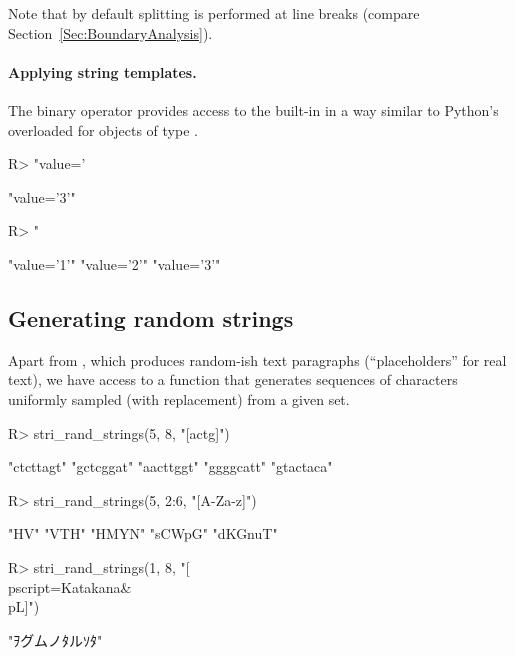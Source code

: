 \documentclass[nojss]{jss}
\begin{document}
Note that by default splitting is performed at line breaks
(compare Section~\ref{Sec:BoundaryAnalysis}).






\paragraph{Applying string templates.}
The binary operator  provides access to the built-in
 in a way similar to Python's \code{\%} overloaded
for objects of type .

\begin{Schunk}
\begin{Sinput}
R> "value='%d'" %s$% 3               # equivalently: "value='%d'" %s$% list(3)
\end{Sinput}
\begin{Soutput}
[1] "value='3'"
\end{Soutput}
\begin{Sinput}
R> "%s='%d'"    %s$% list("value", 1:3)
\end{Sinput}
\begin{Soutput}
[1] "value='1'" "value='2'" "value='3'"
\end{Soutput}
\end{Schunk}





\subsection{Generating random strings}

Apart from ,
which produces random-ish text paragraphs (``placeholders'' for real text),
we have access to a function that generates sequences of characters
uniformly sampled (with replacement) from a given set.

\begin{Schunk}
\begin{Sinput}
R> stri_rand_strings(5, 8, "[actg]")
\end{Sinput}
\begin{Soutput}
[1] "ctcttagt" "gctcggat" "aacttggt" "ggggcatt" "gtactaca"
\end{Soutput}
\begin{Sinput}
R> stri_rand_strings(5, 2:6, "[A-Za-z]")
\end{Sinput}
\begin{Soutput}
[1] "HV"     "VTH"    "HMYN"   "sCWpG"  "dKGnuT"
\end{Soutput}
\begin{Sinput}
R> stri_rand_strings(1, 8, "[\\p{script=Katakana}&\\p{L}]")
\end{Sinput}
\begin{Soutput}
[1] "ｦグムノﾀルｿﾀ"
\end{Soutput}
\end{Schunk}
\end{document}
